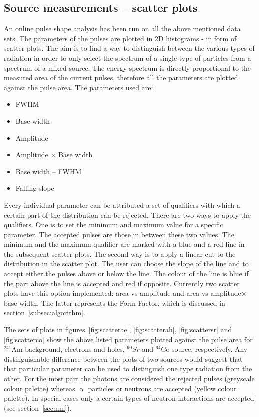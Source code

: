 \subsection{Source measurements -- scatter plots}
An online pulse shape analysis has been run on all the above mentioned data sets. The parameters of the pulses are plotted in 2D histograms - in form of scatter plots. The aim is to find a way to distinguish between the various types of radiation in order to only select the spectrum of a single type of particles from a spectrum of a mixed source. The energy spectrum is directly proportional to the measured area of the current pulses, therefore all the parameters are plotted against the pulse area. The parameters used are: 
\begin{itemize}
\item FWHM
\item Base width
\item Amplitude
\item Amplitude $\times$ Base width
\item Base width -- FWHM
\item Falling slope
\end{itemize}
Every individual parameter can be attributed a set of qualifiers with which a certain part of the distribution can be rejected. There are two ways to apply the qualifiers. One is to set the minimum and maximum value for a specific parameter. The accepted pulses are those in between these two values. The minimum and the maximum qualifier are marked with a blue and a red line in the subsequent scatter plots. The second way is to apply a linear cut to the distribution in the scatter plot. The user can choose the slope of the line and to accept either the pulses above or below the line. The colour of the line is blue if the part above the line is accepted and red if opposite. Currently two scatter plots have this option implemented: area vs amplitude and area vs amplitude$\times$base width. The latter represents the Form Factor, which is discussed in section~\ref{subsec:algorithm}.

The sets of plots in figures~\ref{fig:scatterae}, \ref{fig:scatterah}, \ref{fig:scattersr} and \ref{fig:scatterco} show the above listed parameters plotted against the pulse area for $^{241}$Am background, electrons and holes, $^{90}Sr$ and $^{64}$Co source, respectively. Any distinguishable difference between the plots of two sources would suggest that that particular parameter can be used to distinguish one type radiation from the other. For the most part the photons are considered the rejected pulses (greyscale colour palette) whereas $\upalpha$ particles or neutrons are accepted (yellow colour palette). In special cases only a certain types of neutron interactions are accepted (see section~\ref{sec:nm}).

